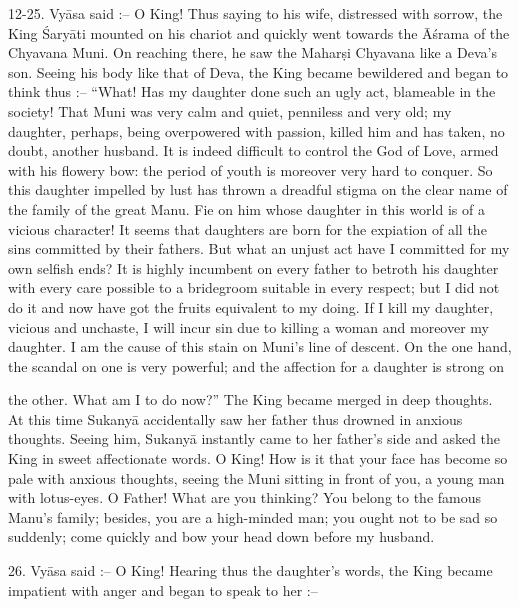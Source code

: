 12-25. Vy\=asa said :-- O King! Thus saying to his wife, distressed with sorrow, the King \'Sary\=ati mounted on his chariot and quickly went towards the \=A\'srama of the Chyavana Muni. On reaching there, he saw the Mahar\d{s}i Chyavana like a Deva's son. Seeing his body like that of Deva, the King became bewildered and began to think thus :-- ``What! Has my daughter done such an ugly act, blameable in the society! That Muni was very calm and quiet, penniless and very old; my daughter, perhaps, being overpowered with passion, killed him and has taken, no doubt, another husband. It is indeed difficult to control the God of Love, armed with his flowery bow: the period of youth is moreover very hard to conquer. So this daughter impelled by lust has thrown a dreadful stigma on the clear name of the family of the great Manu. Fie on him whose daughter in this world is of a vicious character! It seems that daughters are born for the expiation of all the sins committed by their fathers. But what an unjust act have I committed for my own selfish ends? It is highly incumbent on every father to betroth his daughter with every care possible to a bridegroom suitable in every respect; but I did not do it and now have got the fruits equivalent to my doing. If I kill my daughter, vicious and unchaste, I will incur sin due to killing a woman and moreover my daughter. I am the cause of this stain on Muni's line of descent. On the one hand, the scandal on one is very powerful; and the affection for a daughter is strong on

the other. What am I to do now?'' The King became merged in deep thoughts. At this time Sukany\=a accidentally saw her father thus drowned in anxious thoughts. Seeing him, Sukany\=a instantly came to her father's side and asked the King in sweet affectionate words. O King! How is it that your face has become so pale with anxious thoughts, seeing the Muni sitting in front of you, a young man with lotus-eyes. O Father! What are you thinking? You belong to the famous Manu's family; besides, you are a high-minded man; you ought not to be sad so suddenly; come quickly and bow your head down before my husband.

26. Vy\=asa said :-- O King! Hearing thus the daughter's words, the King became impatient with anger and began to speak to her :--

